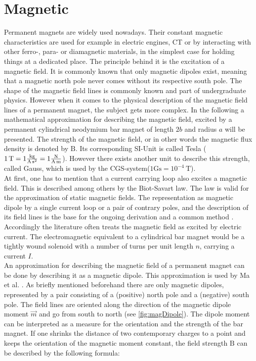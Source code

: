 \section{Magnetic} \label{sec:magneticFound}
Permanent magnets are widely used nowadays. Their constant magnetic characteristics are used for example in electric engines, \ac{CT} or by interacting with other ferro-, para- or diamagnetic materials, in the simplest case for holding things at a dedicated place. The principle behind it is the excitation of a magnetic field. It is commonly known that only magnetic dipoles exist, meaning that a magnetic north pole never comes without its respective south pole. The shape of the magnetic field lines is commonly known and part of undergraduate physics. However when it comes to the physical description of the magnetic field lines of a permanent magnet, the subject gets more complex. In the following a mathematical approximation for describing the magnetic field, excited by a permanent cylindrical neodymium bar magnet of length $ 2b $ and radius $ a $ will be presented. The strength of the magnetic field, or in other words the magnetic flux density is denoted by $ \mathrm{B} $. Its corresponding SI-Unit is called Tesla ($ \SI{1}{\tesla} = 1 \si[per-mode=fraction]{\kilogram \per \ampere \per \second \squared} = 1 \si[per-mode=fraction]{\newton \per \ampere \per \meter}$). However there exists another unit to describe this strength, called Gauss, which is used by the CGS-system($ 1 \mathrm{Gs} = 10^{-4}\SI{}{\tesla} $). \\
At first, one has to mention that a current carrying loop also excites a magnetic field. This is described among others by the Biot-Savart law. The law is valid for the approximation of static magnetic fields. The representation as magnetic dipole by a single current loop or a pair of contrary poles, and the description of its field lines is the base for the ongoing derivation and a common method \cite{derby2010cylindrical}. Accordingly the literature often treats the magnetic field as excited by electric current. The electromagnetic equivalent to a cylindrical bar magnet would be a tightly wound solenoid with a number of turns per unit length $ n $, carrying a current $ I $.\\
An approximation for describing the magnetic field of a permanent magnet can be done by describing it as a magnetic dipole. This approximation is used by Ma et al. \cite{ma2010magnetic}. As briefly mentioned beforehand there are only magnetic dipoles, represented by a pair consisting of a (positive) north pole and a (negative) south pole. The field lines are oriented along the direction of the magnetic dipole moment $ \vec{m} $ and go from south to north (see \ref{fig:magDipole}). The dipole moment can be interpreted as a measure for the orientation and the strength of the bar magnet. If one shrinks the distance of two contemporary charges to a point and keeps the orientation of the magnetic moment constant, the field strength $ \mathrm{B} $ can be described by the following formula:
